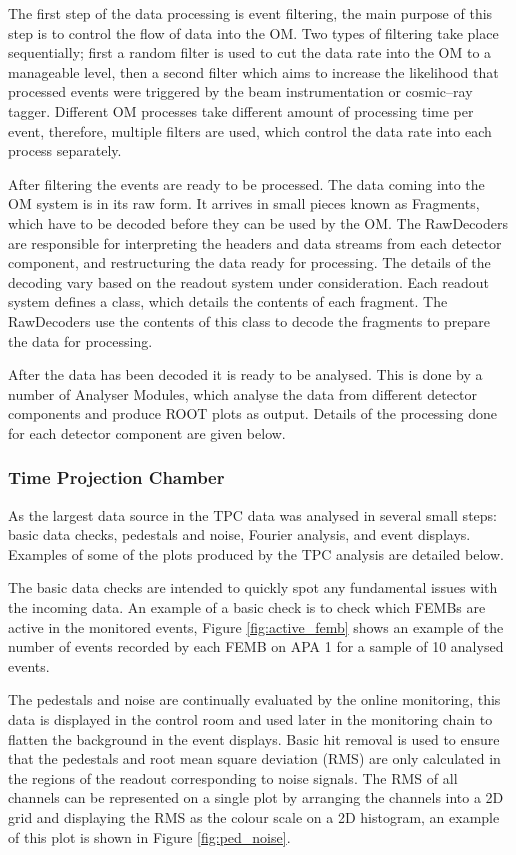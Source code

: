 The first step of the data processing is event filtering, the main purpose of
this step is to control the flow of data into the OM. Two types of filtering
take place sequentially; first a random filter is used to cut the data rate into
the OM to a manageable level, then a second filter which aims to increase the 
likelihood that processed events were triggered by the beam instrumentation or 
cosmic--ray tagger. Different OM processes take different amount of
processing time per event, therefore, multiple filters are used, which control 
the data rate into each process separately.

After filtering the events are ready to be processed. The data coming into the
OM system is in its raw form. It arrives in small pieces known as Fragments,
which have to be decoded before they can be used by the OM. The RawDecoders 
are responsible for interpreting the headers and data streams from each 
detector component, and restructuring the data ready for processing. The 
details of the decoding vary based on the readout system under consideration. 
Each readout system defines a class, which details the contents of each
fragment. The RawDecoders use the contents of this class to decode the fragments
to prepare the data for processing.

After the data has been decoded it is ready to be analysed. This is done by a
number of Analyser Modules, which analyse the data from different detector
components and produce ROOT\cite{ANTCHEVA20092499} plots as output. Details 
of the processing done for each detector component are given below.

\subsubsection*{Time Projection Chamber}
As the largest data source in \protodune{} the TPC data was analysed in several
small steps: basic data checks, pedestals and noise, Fourier analysis, and event
displays. Examples of some of the plots produced by the TPC analysis are
detailed below.

The basic data checks are intended to quickly spot any fundamental issues with
the incoming data. An example of a basic check is to check which FEMBs are
active in the monitored events, Figure \ref{fig:active_femb} shows an example of
the number of events recorded by each FEMB on APA 1 for a sample of 10 analysed
events.

The pedestals and noise are continually evaluated by the online monitoring, this
data is displayed in the control room and used later in the monitoring chain to
flatten the background in the event displays. Basic hit removal is used to 
ensure that the pedestals and root mean square deviation (RMS) are only 
calculated in the regions of the readout corresponding to noise signals. The 
RMS of all channels can be represented on a single plot by arranging the 
channels into a 2D grid and displaying the RMS as the colour scale on a 2D 
histogram, an example of this plot is shown in Figure \ref{fig:ped_noise}.


